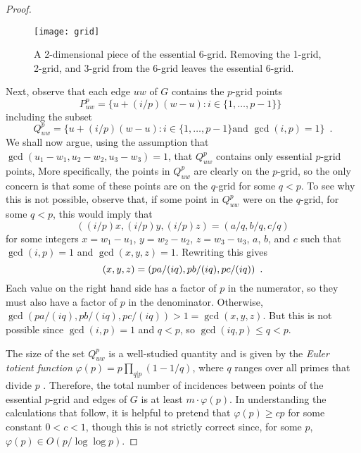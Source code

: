 \documentclass[12pt]{article}
\begin{document}
\begin{proof}
  \begin{figure}
    \begin{center}
      \texttt{[image: grid]}
    \end{center}
    \caption{A 2-dimensional piece of the essential 6-grid.  Removing
     the 1-grid, 2-grid, and 3-grid from the 6-grid leaves the
     essential 6-grid.}
  \end{figure}

  Next, observe that each edge $uw$ of $G$ contains the $p$-grid points
  \[
      P_{uw}^p = \{ u+(i/p)(w-u) : i\in\{1,\ldots,p-1\} \} \enspace 
  \]
  including the subset 
  \[
      Q_{uw}^p = \{ u+(i/p)(w-u) : i\in\{1,\ldots,p-1\}\mbox{
         and  }\gcd(i,p)=1 \} \enspace .
  \]
  We shall now argue, using the assumption that $\gcd(u_1-w_1, u_2-w_2,
  u_3-w_3)=1$, that $Q_{uw}^p$ contains only essential $p$-grid points,
  More specifically, the points in $Q_{uw}^p$ are clearly on the $p$-grid,
  so the only concern is that some of these points are on the $q$-grid
  for some $q<p$.  To see why this is not possible, observe that,
  if some point in $Q_{uw}^p$ were on the $q$-grid, for some $q<p$,
  this would imply that
  \[  ((i/p)x,(i/p)y,(i/p)z) = (a/q,b/q,c/q) \]
  for some integers $x=w_1-u_1$, $y=w_2-u_2$, $z=w_3-u_3$, $a$, $b$, and
  $c$ such that $\gcd(i,p)=1$ and $\gcd(x,y,z)=1$. Rewriting this gives
  \begin{equation}
     (x,y,z) = (pa/(iq),pb/(iq),pc/(iq)) \enspace .   \eqlabel{snapper}
  \end{equation}
  Each value on the right hand side has a factor of $p$ in the numerator,
  so they must also have a factor of $p$ in the denominator.
  Otherwise, $\gcd(pa/(iq),pb/(iq),pc/(iq)) > 1 = \gcd(x,y,z)$.  But this
  is not possible since $\gcd(i,p)=1$ and $q<p$, so $\gcd(iq,p)\le q < p$.

  The size of the set $Q_{uw}^p$ is a well-studied quantity and is given
  by the \emph{Euler totient function} $\varphi(p)=p\prod_{q|p}(1-1/q)$,
  where $q$ ranges over all primes that divide $p$
  \cite[Section~5.5]{hardy.wright:introduction}.  Therefore, the total
  number of incidences between points of the essential $p$-grid and
  edges of $G$ is at least $m\cdot\varphi(p)$.  In understanding the
  calculations that follow, it is helpful to pretend that $\varphi(p)\ge
  cp$ for some constant $0<c<1$, though this is not strictly correct
  since, for some $p$, $\varphi(p)\in O(p/\log\log p)$.


\end{proof}
\end{document}
